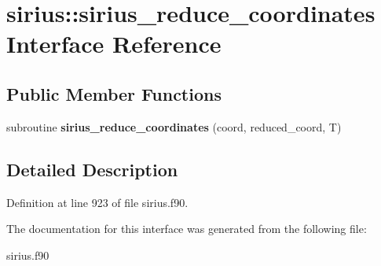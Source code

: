 \hypertarget{interfacesirius_1_1sirius__reduce__coordinates}{}\section{sirius\+:\+:sirius\+\_\+reduce\+\_\+coordinates Interface Reference}
\label{interfacesirius_1_1sirius__reduce__coordinates}
\subsection*{Public Member Functions}
\begin{DoxyCompactItemize}
\item 
\hypertarget{interfacesirius_1_1sirius__reduce__coordinates_a349fbaf8553f14d93346ec862d4225e8}{}subroutine {\bfseries sirius\+\_\+reduce\+\_\+coordinates} (coord, reduced\+\_\+coord, T)\label{interfacesirius_1_1sirius__reduce__coordinates_a349fbaf8553f14d93346ec862d4225e8}

\end{DoxyCompactItemize}


\subsection{Detailed Description}


Definition at line 923 of file sirius.\+f90.



The documentation for this interface was generated from the following file\+:\begin{DoxyCompactItemize}
\item 
sirius.\+f90\end{DoxyCompactItemize}
